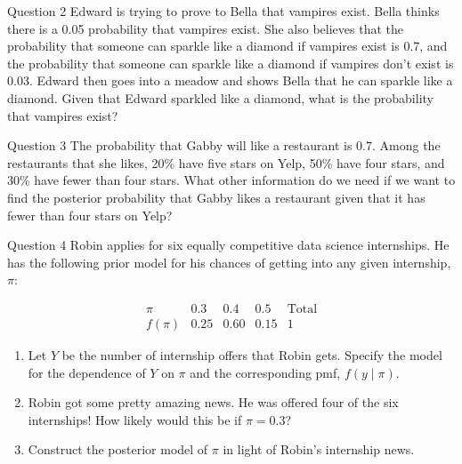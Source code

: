 \documentclass[12pt]{beamer}
\begin{document}
{%
\begin{frame}{}
\begin{block}{Question 2}
Edward is trying to prove to Bella that vampires exist.
Bella thinks there is a 0.05 probability that vampires exist.
She also believes that the probability that someone can sparkle like a diamond if vampires exist is 0.7, and the probability that someone can sparkle like a diamond if vampires don’t exist is 0.03.
Edward then goes into a meadow and shows Bella that he can sparkle like a diamond.
Given that Edward sparkled like a diamond, what is the probability that vampires exist?
\end{block}
\end{frame}

\begin{frame}{}
\begin{block}{Question 3}
The probability that Gabby will like a restaurant is 0.7.
Among the restaurants that she likes, 20\% have five stars on Yelp, 50\% have four stars, and 30\% have fewer than four stars.
What other information do we need if we want to find the posterior probability that Gabby likes a restaurant given that it has fewer than four stars on Yelp?
\end{block}
\end{frame}

\begin{frame}{}
\begin{block}{Question 4}
Robin applies for six equally competitive data science internships. He has the following prior model for his chances of getting into any given internship, $\pi$:

\[
\begin{array}{c|ccc|c}
\pi & 0.3 & 0.4 & 0.5 & \text{Total} \\
\hline
f(\pi) & 0.25 & 0.60 & 0.15 & 1
\end{array}
\]

\begin{enumerate}
\item[(a)] Let $Y$ be the number of internship offers that Robin gets. Specify the model for the dependence of $Y$ on $\pi$ and the corresponding pmf, $f(y \mid \pi)$.
\item[(b)] Robin got some pretty amazing news. He was offered four of the six internships! How likely would this be if $\pi = 0.3$?
\item[(c)] Construct the posterior model of $\pi$ in light of Robin's internship news.
\end{enumerate}
\end{block}
\end{frame}

}
\end{document}
